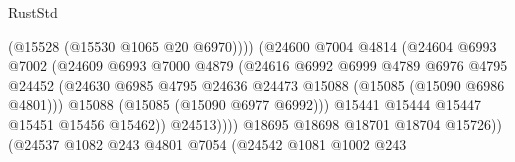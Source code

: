 \begin{lexlean}{RustStd}
\begin{coremodule}
                                                (@15528 (@15530 @1065 @20 @6970))))
                                            (@24600
                                              @7004
                                              @4814
                                              (@24604
                                                @6993
                                                @7002
                                                (@24609
                                                  @6993
                                                  @7000
                                                  @4879
                                                  (@24616
                                                    @6992
                                                    @6999
                                                    @4789
                                                    @6976
                                                    @4795
                                                    @24452
                                                    (@24630
                                                      @6985
                                                      @4795
                                                      @24636
                                                      @24473
                                                      @15088
                                                      (@15085 (@15090 @6986 @4801)))
                                                    @15088
                                                    (@15085 (@15090 @6977 @6992)))
                                                  @15441
                                                  @15444
                                                  @15447
                                                  @15451
                                                  @15456
                                                  @15462))
                                              @24513))))
                                      @18695
                                      @18698
                                      @18701
                                      @18704
                                      @15726))
                                  (@24537
                                    @1082
                                    @243
                                    @4801
                                    @7054
                                    (@24542
                                      @1081
                                      @1002
                                      @243

\end{coremodule}
\end{lexlean}

